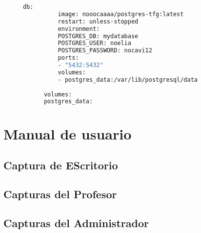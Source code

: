 \begin{appendices}
\begin{figure}[H]
\begin{lstlisting}[language=bash, caption={Fichero Podman-compose para desplegar la bbdd y la app en el servidor}, label=fig:podmancompose]
      db:
          image: nooocaaaa/postgres-tfg:latest
          restart: unless-stopped
          environment:
          POSTGRES_DB: mydatabase
          POSTGRES_USER: noelia
          POSTGRES_PASSWORD: nocavi12
          ports:
          - "5432:5432"
          volumes:
          - postgres_data:/var/lib/postgresql/data
  
      volumes:
      postgres_data:
    \end{lstlisting}
  \end{figure}

\chapter{Manual de usuario} \label{imagenessistema}

\section{Captura de EScritorio}

\section{Capturas del Profesor}

\section{Capturas del Administrador}


\end{appendices}